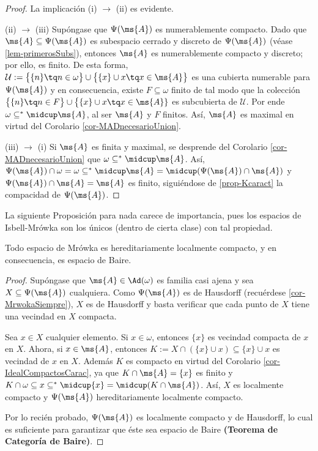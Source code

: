 	\begin{proof} 
		La implicación (i) $\rightarrow$ (ii) es evidente.
		
		(ii) $\rightarrow$ (iii) Supóngase que $\Psi(\ms{A})$ es numerablemente compacto. Dado que $\ms{A} \subseteq \Psi(\ms{A})$ es subespacio cerrado y discreto de $\Psi(\ms{A})$ (véase \ref{lem-primerosSubs}), entonces $\ms{A}$ es numerablemente compacto y discreto; por ello, es finito. De esta forma, $\mathcal{U}:=\big\{ \{n\} \tq n\in \omega \big\} \cup \big\{ \{x\} \cup x \tq x \in \ms{A} \big\}$ es una cubierta numerable para $\Psi(\ms{A})$ y en consecuencia, existe $F \subseteq \omega$ finito de tal modo que la colección $\big \{ \{n\} \tq n \in F \big\} \cup \big\{ \{x\} \cup x \tq x \in \ms{A}\}$ es subcubierta de $\mathcal{U}$. Por ende $\omega \subseteq^* \midcup \ms{A}$, al ser $\ms{A}$ y $F$ finitos. Así, $\ms{A}$ es maximal en virtud del Corolario \ref{cor-MADnecesarioUnion}.
		
		(iii) $\rightarrow$ (i) Si $\ms{A}$ es finita y maximal, se desprende del Corolario \ref{cor-MADnecesarioUnion} que $\omega \subseteq^* \midcup \ms{A}$. Así, $\Psi(\ms{A}) \cap \omega = \omega \subseteq^* \midcup \ms{A} = \midcup (\Psi(\ms{A}) \cap \ms{A} )$ y $\Psi(\ms{A}) \cap \ms{A} = \ms{A}$ es finito, siguiéndose de \ref{prop-Kcaract} la compacidad de $\Psi(\ms{A})$.
	\end{proof}
	
	La siguiente Proposición para nada carece de importancia, pues los espacios de Isbell-Mrówka son los únicos (dentro de cierta clase) con tal propiedad.
	
	\begin{proposicion}\label{prop-MrwokaHLC}
		Todo espacio de Mrówka es hereditariamente localmente compacto, y en consecuencia, es espacio de Baire.
	\end{proposicion}
	
	\begin{proof} 
		Supóngase que $\ms{A}\in \Ad(\omega)$ es familia casi ajena y sea $X \subseteq \Psi(\ms{A})$ cualquiera. Como $\Psi(\ms{A})$ es de Hausdorff (recuérdese \ref{cor-MrwokaSiempre}), $X$ es de Hausdorff y basta verificar que cada punto de $X$ tiene una vecindad en $X$ compacta.
	
		Sea $x \in X$ cualquier elemento. Si $x \in \omega$, entonces $\{x\}$ es vecindad compacta de $x$ en $X$. Ahora, si $x \in \ms{A}$, entonces $K:=X \cap (\{x\} \cup x) \subseteq \{x\} \cup x$ es vecindad de $x$ en $X$. Además $K$ es compacto en virtud del Corolario \ref{cor-IdealCompactosCarac}, ya que $K \cap \ms{A} = \{x\}$ es finito y $K \cap \omega \subseteq x \subseteq^* \midcup \{x\} = \midcup (K \cap \ms{A})$. Así, $X$ es localmente compacto y $\Psi(\ms{A})$ hereditariamente localmente compacto. 
		
		Por lo recién probado, $\Psi(\ms{A})$ es localmente compacto y de Hausdorff, lo cual es suficiente para garantizar que éste sea espacio de Baire \textbf{(Teorema de Categoría de Baire)}.
	\end{proof}
	
